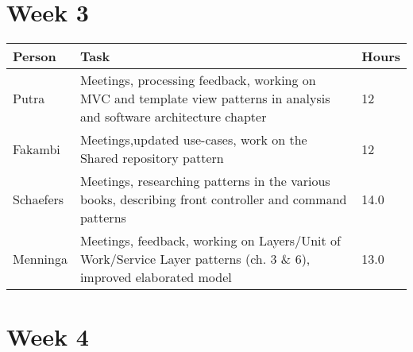 \section*{Week 3}

\begin{longtable}{p{} p{} p{}}
	\textbf{Person} & \textbf{Task} & \textbf{Hours} \\ \toprule
	Putra           & Meetings, processing feedback, working on MVC and template view patterns in analysis and software architecture chapter & 12 \\ \midrule
	Fakambi         & Meetings,updated use-cases, work on the Shared repository pattern & 12 \\ \midrule
	Schaefers       & Meetings, researching patterns in the various books, describing front controller and command patterns& 14.0 \\ \midrule
	Menninga        & Meetings, feedback, working on Layers/Unit of Work/Service Layer patterns (ch. 3 \& 6), improved elaborated model & 13.0 \\ \bottomrule
\end{longtable}

 \section*{Week 4}
 

